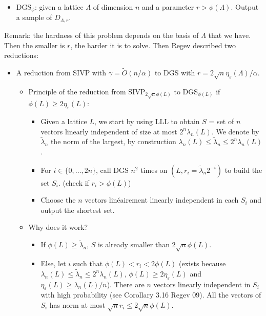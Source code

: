 \begin{itemize}
\item DGS$_{\phi}$: given a lattice $\Lambda$ of dimension $n$ and a parameter $r > \phi(\Lambda)$. Output a sample of $D_{\Lambda,r}$.
\end{itemize}
Remark: the hardness of this problem depends on the basis of $\Lambda$ that we have. Then the smaller is $r$, the harder it is to solve.
Then Regev described two reductions:

\medskip


\begin{itemize}
\item A reduction from SIVP with $\gamma=\tilde{O}(n / \alpha)$ to DGS with $r=2 \sqrt{n} \eta_{\varepsilon}(\Lambda) / \alpha$.
\begin{itemize}
\item Principle of the reduction from SIVP$_{2\sqrt{n} \phi(L)}$ to DGS$_{\phi(L)}$ if $\phi(L) \geq 2  \eta_{\varepsilon}(L)$:
\begin{itemize}
\item Given a lattice $L$, we start by using LLL to obtain $S$ = set of $n$ vectors linearly independent of size at most $2^n \lambda_n(L)$. We denote by $\tilde{\lambda}_n$ the norm of the largest, by construction $\lambda_n(L) \leq \tilde{\lambda}_n \leq 2^n \lambda_n(L) $.
\item For $i \in \{0, \ldots, 2n \}$, call DGS $n^2$ times on $(L,r_i = \tilde{\lambda}_n 2^{-i})$ to build the set $S_i$. (check if $r_i > \phi(L)$)
\item Choose the $n$ vectors linéairement linearly independent in each $S_i$ and output the shortest set.
\end{itemize}
\item Why does it work?
\begin{itemize}
\item If $\phi(L) \geq \tilde{\lambda}_n $, $S$ is already smaller than $2 \sqrt{n} \phi(L)$.
\item Else, let $i$ such that $\phi(L) < r_i < 2 \phi (L)$ (exists because $\lambda_n(L) \leq \tilde{\lambda}_n \leq 2^n \lambda_n(L) $, $\phi(L) \geq 2  \eta_{\varepsilon}(L)$ and $\eta_{\varepsilon}(L) \geq \lambda_n(L)/n$). There are  $n$ vectors linearly independent in $S_i$ with high probability (see Corollary 3.16 Regev 09). All the vectors of $S_i$ has norm at most $\sqrt{n} r_i \leq 2 \sqrt{n} \phi (L)$.
\end{itemize}
\end{itemize}

\end{itemize}
